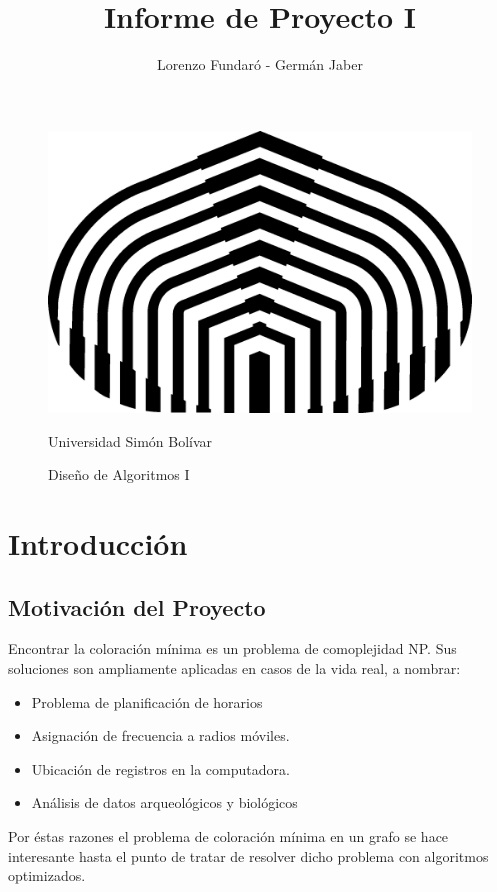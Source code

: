 \documentclass[a4paper,10pt]{article}
\title{Informe de Proyecto I}
\author{Lorenzo Fundaró - Germán Jaber}
\begin{document}
\begin{figure}[t]
\begin{center}
\includegraphics[scale = 0.75]{usb.png}
\end{center}
\begin{center}
\large Universidad Simón Bolívar
\end{center}
\begin{center}
 \large Diseño de Algoritmos I
\end{center}


\end{figure}


\maketitle


\thispagestyle{empty}
\newpage

\tableofcontents{}
\newpage


\section{Introducción}

\subsection{Motivación del Proyecto}
Encontrar la coloración mínima es un problema de comoplejidad NP. 
Sus soluciones son ampliamente aplicadas en casos de la vida real, a nombrar:
\begin{itemize}
 \item Problema de planificación de horarios
 \item Asignación de frecuencia a radios móviles.
 \item Ubicación de registros en la computadora.
 \item Análisis de datos arqueológicos y biológicos
\end{itemize}
Por éstas razones el problema de coloración mínima en un grafo se hace 
interesante hasta el punto de tratar de resolver dicho problema con 
algoritmos optimizados.
\end{document}
